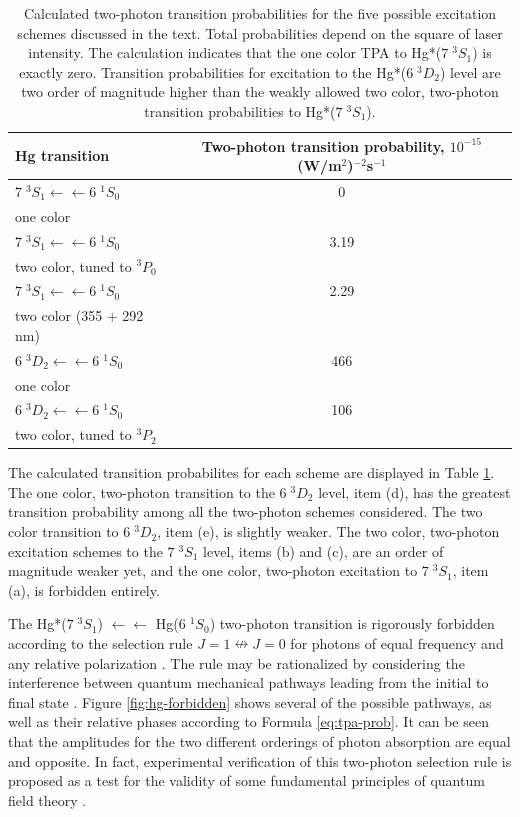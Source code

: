 \begin{table}
  \caption{Calculated two-photon transition probabilities for the five
    possible excitation schemes discussed in the text.  Total
    probabilities depend on the square of laser intensity.  The
    calculation indicates that the one color TPA to Hg*($7 \; ^3S_1$)
    is exactly zero.  Transition probabilities for excitation to the
    Hg*($6 \; ^3D_2$) level are two order of magnitude higher than the
    weakly allowed two color, two-photon transition probabilities to
    Hg*($7 \; ^3S_1$).}
  \label{table:tpa-prob}
  \centering
  \vspace{1cm}
  \begin{tabular}{lc}
    \toprule
    Hg transition & Two-photon transition probability, $10^{-15}$ (W/m$^2$)$^{-2}$s$^{-1}$\\
    \midrule
    $7 \; ^3S_1 \leftarrow \leftarrow 6 \; ^1S_0$ & 0 \\
    one color\\
    $7 \; ^3S_1 \leftarrow \leftarrow 6 \; ^1S_0$ & 3.19 \\ 
    two color, tuned to $^3P_0$\\
    $7 \; ^3S_1 \leftarrow \leftarrow 6 \; ^1S_0$ & 2.29 \\
    two color (355 + 292 nm)\\
    $6 \; ^3D_2 \leftarrow \leftarrow 6 \; ^1S_0$ & 466 \\
    one color\\
    $6 \; ^3D_2 \leftarrow \leftarrow 6 \; ^1S_0$ & 106 \\
    two color, tuned to $^3P_2$\\
    \bottomrule
  \end{tabular}
\end{table}

The calculated transition probabilites for each scheme are displayed
in Table \ref{table:tpa-prob}.  The one color, two-photon transition
to the $6 \; ^3D_2$ level, item (d), has the greatest transition
probability among all the two-photon schemes considered.  The two
color transition to $6 \; ^3D_2$, item (e), is slightly weaker.  The
two color, two-photon excitation schemes to the $7 \; ^3S_1$ level,
items (b) and (c), are an order of magnitude weaker yet, and the one
color, two-photon excitation to $7 \; ^3S_1$, item (a), is forbidden
entirely.

The Hg*($7 \; ^3S_1$) $\leftarrow\leftarrow$ Hg($6 \; ^1S_0$)
two-photon transition is rigorously forbidden according to the
selection rule $J=1 \nleftrightarrow J=0$ for photons of equal
frequency and any relative polarization \cite{bonin84}.  The rule may
be rationalized by considering the interference between quantum
mechanical pathways leading from the initial to final state
\cite{bonin84, grynberg77}.  Figure \ref{fig:hg-forbidden} shows
several of the possible pathways, as well as their relative phases
according to Formula \ref{eq:tpa-prob}.  It can be seen that the
amplitudes for the two different orderings of photon absorption are
equal and opposite.  In fact, experimental verification of this
two-photon selection rule is proposed as a test for the validity of
some fundamental principles of quantum field theory \cite{hilborn02}.

